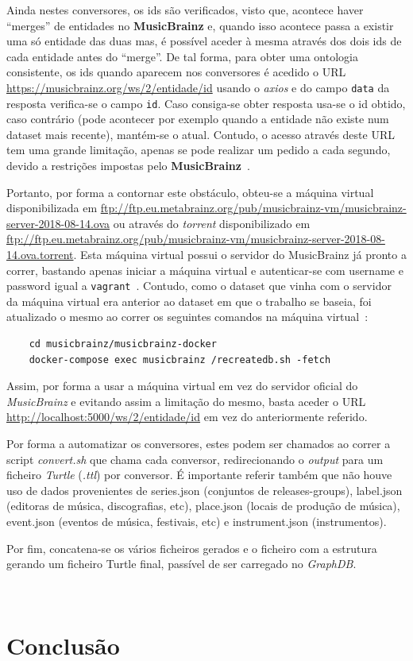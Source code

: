\documentclass{article}
\begin{document}
Ainda nestes conversores, os ids são verificados, visto que, acontece haver ``merges'' de entidades no \textbf{MusicBrainz} e, quando isso acontece passa a existir uma só entidade das duas mas, é possível aceder à mesma através dos dois ids de cada entidade antes do ``merge''. De tal forma, para obter uma ontologia consistente, os ids quando aparecem nos conversores é acedido o URL \url{https://musicbrainz.org/ws/2/entidade/id} usando o \textit{axios} e do campo \texttt{data} da resposta verifica-se o campo \texttt{id}. Caso consiga-se obter resposta usa-se o id obtido, caso contrário (pode acontecer por exemplo quando a entidade não existe num dataset mais recente), mantém-se o atual. Contudo, o acesso através deste URL tem uma grande limitação, apenas se pode realizar um pedido a cada segundo, devido a restrições impostas pelo \textbf{MusicBrainz}~\cite{mbLimit}. 

Portanto, por forma a contornar este obstáculo, obteu-se a máquina virtual disponibilizada em \url{ftp://ftp.eu.metabrainz.org/pub/musicbrainz-vm/musicbrainz-server-2018-08-14.ova} ou através do \textit{torrent} disponibilizado em \url{ftp://ftp.eu.metabrainz.org/pub/musicbrainz-vm/musicbrainz-server-2018-08-14.ova.torrent}. Esta máquina virtual possui o servidor do MusicBrainz já pronto a correr, bastando apenas iniciar a máquina virtual e autenticar-se com username e password igual a \texttt{vagrant}~\cite{mbSetup}. Contudo, como o dataset que vinha com o servidor da máquina virtual era anterior ao dataset em que o trabalho se baseia, foi atualizado o mesmo ao correr os seguintes comandos na máquina virtual~\cite{mbUpdate}:

\begin{framed}
\begin{verbatim}
    cd musicbrainz/musicbrainz-docker
    docker-compose exec musicbrainz /recreatedb.sh -fetch
\end{verbatim}
\end{framed}

Assim, por forma a usar a máquina virtual em vez do servidor oficial do \textit{MusicBrainz} e evitando assim a limitação do mesmo, basta aceder o URL \url{http://localhost:5000/ws/2/entidade/id} em vez do anteriormente referido.

Por forma a automatizar os conversores, estes podem ser chamados ao correr a script \textit{convert.sh} que chama cada conversor, redirecionando o \textit{output} para um ficheiro \textit{Turtle} (\textit{.ttl}) por conversor. É importante referir também que não houve uso de dados provenientes de series.json (conjuntos de releases-groups), label.json (editoras de música, discografias, etc), place.json (locais de produção de música), event.json (eventos de música, festivais, etc) e instrument.json (instrumentos).

Por fim, concatena-se os vários ficheiros gerados e o ficheiro com a estrutura gerando um ficheiro Turtle final, passível de ser carregado no \textit{GraphDB}.

~\cite{mbAnnotation}

\section{Conclusão}

\newpage 
\printbibliography

\begin{appendices}

\end{appendices}
\end{document}
